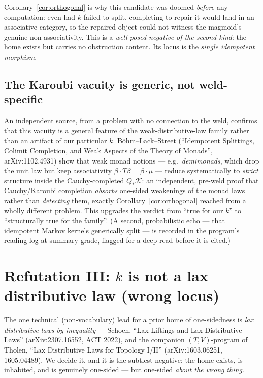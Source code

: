 \documentclass[11pt]{amsart}
\theoremstyle{plain}
\theoremstyle{definition}
\theoremstyle{remark}
\begin{document}
Corollary~\ref{cor:orthogonal} is why this candidate was doomed \emph{before} any computation: even
had $k$ failed to split, completing to repair it would land in an associative category, so the
repaired object could not witness the magmoid's genuine non-associativity. This is a
\emph{well-posed negative of the second kind}: the home exists but carries no obstruction content.
Its locus is the \emph{single idempotent morphism}.

\subsection*{The Karoubi vacuity is generic, not weld-specific}
\label{sec:generic}

An independent source, from a problem with no connection to the weld, confirms that this vacuity is a
general feature of the weak-distributive-law family rather than an artifact of our particular $k$.
B\"ohm--Lack--Street (``Idempotent Splittings, Colimit Completion, and Weak Aspects of the Theory of
Monads'', arXiv:1102.4931) show that weak monad notions --- e.g.\ \emph{demimonads}, which drop the
unit law but keep associativity $\beta\cdot T\beta=\beta\cdot\mu$ --- reduce systematically to
\emph{strict} structure inside the Cauchy-completed $Q_{*}\mathcal{K}$: an independent, pre-weld
proof that Cauchy/Karoubi completion \emph{absorbs} one-sided weakenings of the monad laws rather
than \emph{detecting} them, exactly Corollary~\ref{cor:orthogonal} reached from a wholly different
problem. This upgrades the verdict from ``true for our $k$'' to ``structurally true for the family''.
(A second, probabilistic echo --- that idempotent Markov kernels generically split --- is recorded in
the program's reading log at summary grade, flagged for a deep read before it is cited.)

\section{Refutation III: \texorpdfstring{$k$}{k} is not a lax distributive law (wrong locus)}
\label{sec:laxdl}

The one technical (non-vocabulary) lead for a prior home of one-sidedness is \emph{lax distributive
laws by inequality} --- Schoen, ``Lax Liftings and Lax Distributive Laws'' (arXiv:2307.16552, ACT
2022), and the companion $(T,V)$-program of Tholen, ``Lax Distributive Laws for Topology I/II''
(arXiv:1603.06251, 1605.04489). We decide it, and it is the subtlest negative: the home exists, is
inhabited, and is genuinely one-sided --- but one-sided \emph{about the wrong thing}.
\end{document}
